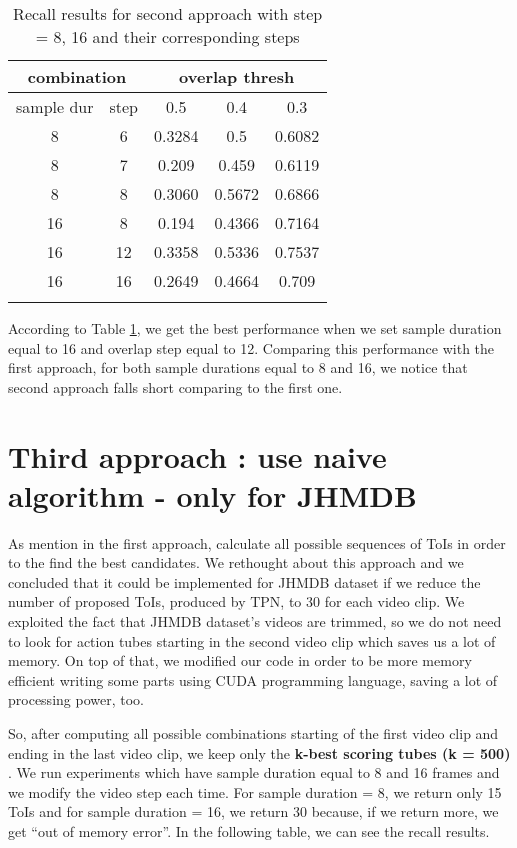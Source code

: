 \begin{center}
\begin{longtable}{||c c||c c c||}
  \hline
  \multicolumn{2}{||c||}{\textbf{combination}} &\multicolumn{3}{|c||}{\textbf{overlap thresh}}\\

  \hline
  sample dur & step &   0.5  &  0.4 &  0.3 \\
  \hline   \hline
  8 & 6 & 0.3284 & 0.5 & 0.6082  \\
  \hline
  8 & 7 & 0.209	& 0.459 & 0.6119 \\
  \hline
  8 & 8 & 0.3060 & 0.5672 & 0.6866 \\
  \hline
  16 & 8  & 0.194 & 0.4366 & 0.7164 \\
  \hline
  16 & 12 & 0.3358 & 0.5336 & 0.7537 \\
  \hline
  16 & 16 & 0.2649 & 0.4664 & 0.709 \\
  
  \hline     \hline                          

  \caption{Recall results for second approach with step = 8, 16 and their corresponding steps }
  \label{table:conn_app2}
\end{longtable} 
\end{center}

According to  Table \ref{table:conn_app2}, we get the best performance when we set sample duration equal to  16 and overlap step equal to 12.
Comparing this performance with the first approach, for both sample durations equal to 8 and 16, we notice that second approach falls short
comparing to the first one. 

\section{Third approach : use naive algorithm - only for JHMDB}

As mention in the first approach, \cite{DBLP:journals/corr/HouCS17} calculate all possible sequences of ToIs in order to the find the best
candidates. We rethought about this approach and we concluded that it could be implemented for JHMDB dataset if we reduce the number of proposed
ToIs, produced by TPN,  to 30 for each video clip. We exploited the fact that JHMDB dataset's videos are trimmed, so we do not need to look
for action tubes starting in the second video clip which saves us a lot of memory. On top of that, we modified our code
in order to be more memory efficient  writing some parts using CUDA programming language, saving a lot of processing power, too. \par
So, after computing all possible combinations starting of the first video clip and ending in the last video clip, we keep only the
\textbf{k-best scoring tubes (k = 500) }. We run experiments which have sample duration equal to 8 and 16 frames and we modify the video step each time.
For sample duration = 8, we return only 15 ToIs and for sample duration = 16, we return 30 because, if we return more, we get ``out of memory error''.
In the following table, we can see the recall results. \par  

